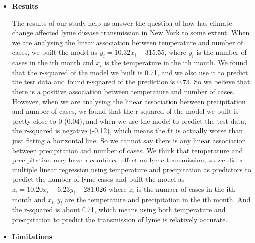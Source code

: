 \documentclass[fontsize=11pt]{article}
\begin{document}
\begin{itemize}
  \item \textbf{Results}

The results of our study help us answer the question of how has climate change affected lyme disease transmission in New York to some extent. When we are analysing the linear association between temperature and number of cases, we built the model as $y_i = 10.32x_i -315.55$, where $y_i$ is the number of cases in the ith month and $x_i$ is the temperature in the ith month. We found that the r-squared of the model we built is 0.71, and we also use it to predict the test data and found r-squared of the prediction is 0.73. So we believe that there is a positive association between temperature and number of cases. However, when we are analysing the linear association between precipitation and number of cases, we found that the r-squared of the model we built is pretty close to 0 (0.04), and when we use the model to predict the test data, the r-squared is negative (-0.12), which means the fit is actually worse than just fitting a horizontal line. So we cannot say there is any linear association between precipitation and number of cases. We think that temperature and precipitation may have a combined effect on lyme transmission, so we did a multiple linear regression using temperature and precipitation as predictors to predict the number of lyme cases and built the model as $z_i = 10.20x_i - 6.23y_i - 281.026$ where $z_i$ is the number of cases in the ith month and $x_i, y_i$ are the temperature and precipitation in the ith month. And the r-squared is about 0.71, which means using both temperature and precipitation to predict the transmission of lyme is relatively accurate.\\
  \item \textbf{Limitations}


\end{itemize}
\end{document}
